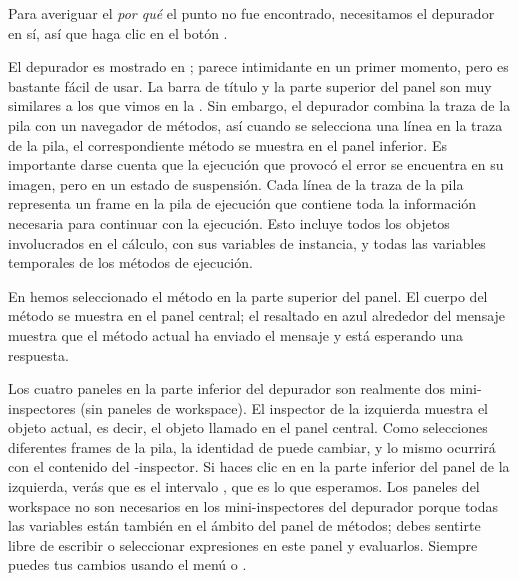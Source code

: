 \documentclass[spanish,a4paper,10pt,twoside]{book}
\begin{document}
Para averiguar el \emph{por qu\'e} el punto no fue encontrado, necesitamos el depurador en s\'i, as\'i que haga clic en el bot\'on .


El depurador es mostrado en ; parece intimidante en un primer momento, pero es bastante f\'acil de usar.
La barra de t\'itulo y la parte superior del panel son muy similares a los que vimos en la .
Sin embargo, el depurador combina la traza de la pila con un navegador de m\'etodos, as\'i cuando se selecciona una l\'inea en la traza de la pila, el correspondiente m\'etodo se muestra en el panel inferior.
Es importante darse cuenta que la ejecuci\'on que provoc\'o el error se encuentra en su imagen, pero en un estado de suspensi\'on.
Cada l\'inea de la traza de la pila representa un frame en la pila de ejecuci\'on que contiene toda la informaci\'on necesaria para continuar con la ejecuci\'on.  Esto incluye todos los objetos involucrados en el c\'alculo, con sus variables de instancia, y todas las variables temporales de los m\'etodos de ejecuci\'on.

En  hemos seleccionado el m\'etodo  en la parte superior del panel.
El cuerpo del m\'etodo se muestra en el panel central; el resaltado en azul alrededor del mensaje  muestra que el m\'etodo actual ha enviado el mensaje  y est\'a esperando una respuesta.

Los cuatro paneles en la parte inferior del depurador son realmente dos mini-inspectores (sin paneles de workspace).
El inspector de la izquierda muestra el objeto actual, es decir, el objeto llamado \self en el panel central.
Como selecciones diferentes frames de la pila, la identidad de \self puede cambiar, y lo mismo ocurrir\'a con el contenido del
\self{}-inspector.
Si haces clic en \self en la parte inferior del panel de la izquierda, ver\'as que \self es el intervalo , que es lo que esperamos.
Los paneles del workspace no son necesarios en los mini-inspectores del depurador porque todas las variables est\'an tambi\'en en el \'ambito del panel de m\'etodos; debes sentirte libre de escribir o seleccionar expresiones en este panel y evaluarlos.
Siempre puedes  tus cambios usando el men\'u o .
\end{document}
